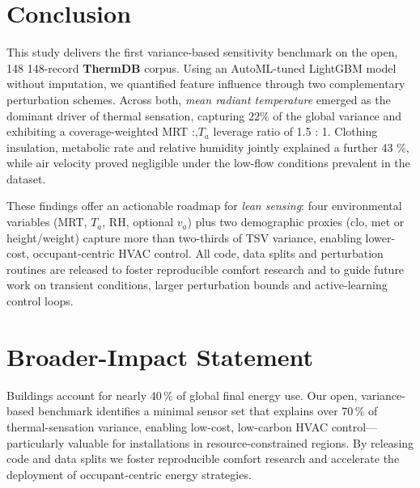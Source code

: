 \documentclass{article}
\theoremstyle{plain}
\theoremstyle{definition}
\theoremstyle{remark}
\begin{document}

\section{Conclusion}\label{sec:concl}

This study delivers the first variance-based sensitivity benchmark on the open, 148 148-record \textbf{ThermDB} corpus. Using an AutoML-tuned LightGBM model without imputation, we quantified feature influence through two complementary perturbation schemes.
Across both, \emph{mean radiant temperature} emerged as the dominant driver of thermal sensation, capturing 22\% of the global variance and exhibiting a coverage-weighted MRT :,$T_a$ leverage ratio of 1.5 : 1. Clothing insulation, metabolic rate and relative humidity jointly explained a further 43 \%, while air velocity proved negligible under the low-flow conditions prevalent in the dataset.

These findings offer an actionable roadmap for \emph{lean sensing}: four environmental variables (MRT, $T_a$, RH, optional $v_a$) plus two demographic proxies (clo, met or height/weight) capture more than two-thirds of TSV variance, enabling lower-cost, occupant-centric HVAC control.
All code, data splits and perturbation routines are released to foster reproducible comfort research and to guide future work on transient conditions, larger perturbation bounds and active-learning control loops.

\section*{Broader-Impact Statement}
Buildings account for nearly 40\,\% of global final energy use.
Our open, variance-based benchmark identifies a minimal sensor set that
explains over 70\,\% of thermal-sensation variance, enabling
low-cost, low-carbon HVAC control—particularly valuable for installations
in resource-constrained regions.  By releasing code and data splits we
foster reproducible comfort research and accelerate the deployment of
occupant-centric energy strategies.
\end{document}
